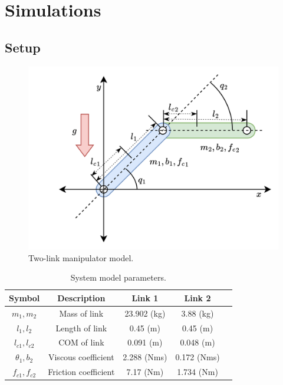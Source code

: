 \documentclass[letterpaper, 10 pt, conference]{ieeeconf}  %
\begin{document}

\section{Simulations}\label{sec:sim}

\subsection{Setup}

\begin{figure}[!t]
    \centering
    \includegraphics[width=0.8\linewidth]{RobotModel.drawio.png}
    \caption{Two-link manipulator model.}
    \label{fig: manipulator}
\end{figure}

\begin{table}[!t]
    \renewcommand{\arraystretch}{1.3}
    \caption{System model parameters.}
    \centering
    \begin{tabular}{|c||c|c|c|c|}
    \hline
    Symbol & \textbf{Description} & \textbf{Link 1} & \textbf{Link 2} \\
    \hline 
    $m_1, m_2$ & Mass of link    & 23.902 (kg) & 3.88 (kg) \\
    \hline
    $l_1, l_2$  & Length of link   & 0.45 (m) & 0.45 (m) \\
    \hline
    $l_{c1}, l_{c2}$ & COM of link  & 0.091 (m) & 0.048 (m) \\
    \hline
    $\theta_1, b_2$   & Viscous coefficient  &  2.288 (Nms) & 0.172 (Nms) \\
    \hline
    $f_{c1}, f_{c2}$  & Friction coefficient &  7.17 (Nm) & 1.734 (Nm) \\
    \hline
    \end{tabular}
    \label{table: system parameters}
\end{table}
\end{document}
